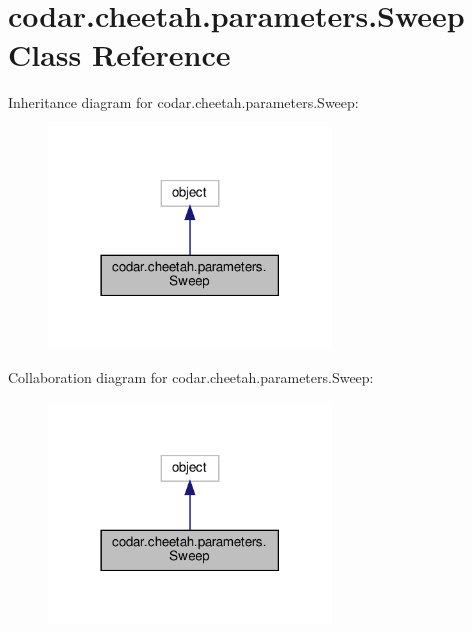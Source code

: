 \hypertarget{classcodar_1_1cheetah_1_1parameters_1_1_sweep}{}\section{codar.\+cheetah.\+parameters.\+Sweep Class Reference}
\label{classcodar_1_1cheetah_1_1parameters_1_1_sweep}


Inheritance diagram for codar.\+cheetah.\+parameters.\+Sweep\+:
\nopagebreak
\begin{figure}[H]
\begin{center}
\leavevmode
\includegraphics[width=213pt]{classcodar_1_1cheetah_1_1parameters_1_1_sweep__inherit__graph}
\end{center}
\end{figure}


Collaboration diagram for codar.\+cheetah.\+parameters.\+Sweep\+:
\nopagebreak
\begin{figure}[H]
\begin{center}
\leavevmode
\includegraphics[width=213pt]{classcodar_1_1cheetah_1_1parameters_1_1_sweep__coll__graph}
\end{center}
\end{figure}
